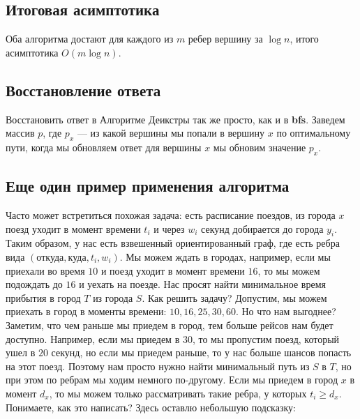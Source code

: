 \documentclass[../../main.tex]{subfiles}
\begin{document}
\subsection{Итоговая асимптотика}

Оба алгоритма достают для каждого из $m$ ребер вершину за $\log{n}$, итого асимптотика $O(m \log{n})$. 

\subsection{Восстановление ответа}

Восстановить ответ в Алгоритме Деикстры так же просто, как и в \textbf{bfs}. Заведем массив $p$, где $p_x$ --- из какой вершины мы попали в вершину $x$ по оптимальному пути, когда
мы обновляем ответ для вершины $x$ мы обновим значение $p_x$.




\subsection{Еще один пример применения алгоритма}

Часто может встретиться похожая задача: есть расписание поездов, из города $x$ поезд уходит в момент времени $t_i$ и через $w_i$ секунд добирается до города $y_i$. 
Таким образом, у нас есть взвешенный ориентированный граф, где есть ребра вида $(\text{откуда}, \text{куда}, t_i, w_i)$. Мы можем ждать в городах, например,
если мы приехали во время $10$ и поезд уходит в момент времени $16$, то мы можем подождать до $16$ и уехать на поезде. Нас просят найти минимальное время прибытия в город $T$ из 
города $S$.
Как решить задачу? Допустим, мы можем приехать в город в моменты времени: $10, 16, 25, 30, 60$. Но что нам выгоднее? Заметим, что чем раньше мы приедем в город,
тем больше рейсов нам будет доступно. Например, если мы приедем в $30$, то мы пропустим поезд, который ушел в $20$ секунд, но если мы приедем раньше, то у нас больше шансов попасть на этот поезд.
Поэтому нам просто нужно найти минимальный путь из $S$ в $T$, но при этом по ребрам мы ходим немного по-другому. Если мы приедем в город $x$ в момент $d_x$, то 
мы можем только рассматривать такие ребра, у которых $t_i \geq d_x$. Понимаете, как это написать? Здесь оставлю небольшую подсказку:

\end{document}
